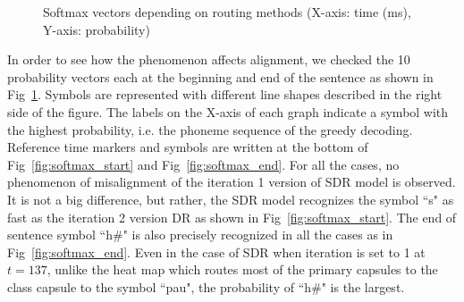 \documentclass[review]{elsarticle}
\begin{document}
\begin{figure}[ht]
\centering
{}
\qquad
{}
\caption[]{Softmax vectors depending on routing methods (X-axis: time (ms), Y-axis: probability)}
\label{fig:softmax_output}
\end{figure}

In order to see how the phenomenon affects alignment, we checked the 10 probability vectors each at the beginning and end of the sentence as shown in Fig~\ref{fig:softmax_output}.
Symbols are represented with different line shapes described in the right side of the figure.
The labels on the X-axis of each graph indicate a symbol with the highest probability, i.e. the phoneme sequence of the greedy decoding.
Reference time markers and symbols are written at the bottom of Fig~\ref{fig:softmax_start} and Fig~\ref{fig:softmax_end}.
For all the cases, no phenomenon of misalignment of the iteration 1 version of SDR model is observed.
It is not a big difference, but rather, the SDR model recognizes the symbol ``s" as fast as the iteration 2 version DR as shown in Fig~\ref{fig:softmax_start}.
The end of sentence symbol ``h\#" is also precisely recognized in all the cases as in Fig~\ref{fig:softmax_end}.
Even in the case of SDR when iteration is set to 1 at $t=137$, unlike the heat map which routes most of the primary capsules to the class capsule to the symbol ``pau", the probability of ``h\#" is the largest.
\end{document}
